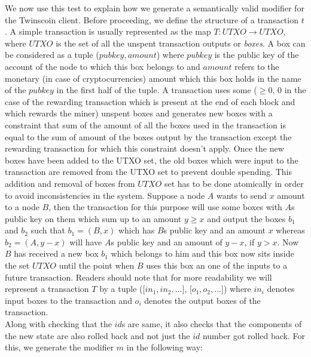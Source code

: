 \begin{enumerate}[\IEEEsetlabelwidth{Z}]
\begin{itemize}[]
We now use this test to explain how we generate a semantically valid modifier for the Twinscoin client. Before proceeding, we define the structure of a transaction $t$. A simple transaction is usually represented as the map $T : UTXO \to UTXO$, where $UTXO$ is the set of all the unspent transaction outputs or \textit{boxes}. A box can be considered as a tuple ($pubkey, amount$) where $pubkey$ is the public key of the account of the node to which this box belongs to and $amount$ refers to the monetary (in case of cryptocurrencies) amount which this box holds in the name of the $pubkey$ in the first half of the tuple. A transaction uses some ($\geq 0$, 0 in the case of the rewarding transaction which is present at the end of each block and which rewards the miner) unspent boxes and generates new boxes with a constraint that sum of the amount of all the boxes used in the transaction is equal to the sum of amount of the boxes output by the transaction except the rewarding transaction for which this constraint doesn't apply. Once the new boxes have been added to the UTXO set, the old boxes which were input to the transaction are removed from the UTXO set to prevent double spending. This addition and removal of boxes from $UTXO$ set has to be done atomically in order to avoid inconsistencies in the system. Suppose a node $A$ wants to send $x$ amount to a node $B$, then the transaction for this purpose will use some boxes with $A$s public key on them which sum up to an amount $y \geq x$ and output the boxes $b_1$ and $b_2$ such that $b_1 = (B, x)$ which has $B$s public key and an amount $x$ whereas $b_2 = (A, y-x)$ will have $A$s public key and an amount of $y-x$, if $y>x$. Now $B$ has received a new box $b_1$ which belongs to him and this box now sits inside the set $UTXO$ until the point when $B$ uses this box an one of the inputs to a future transaction. Readers should note that for more readability we will represent a transaction $T$ by a tuple ([$in_1, in_2, ...$], [$o_1, o_2, ...$]) where $in_i$ denotes input boxes to the transaction and $o_i$ denotes the output boxes of the transaction.\\
Along with checking that the $id$s are same, it also checks that the components of the new state are also rolled back and not just the $id$ number got rolled back. For this, we generate the modifier $m$ in the following way:


\end{itemize}
\end{enumerate}
